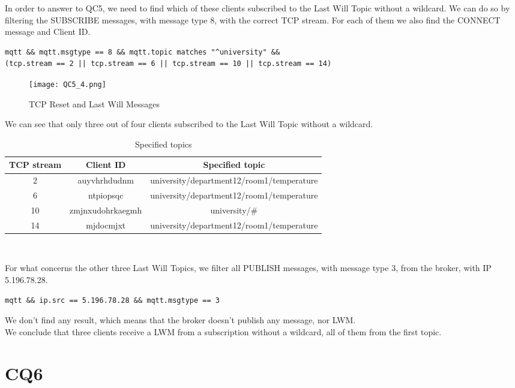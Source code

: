 In order to answer to QC5, we need to find which of these clients subscribed to the Last Will Topic without a wildcard. We can do so by filtering the SUBSCRIBE messages, with message type 8, with the correct TCP stream. For each of them we also find the CONNECT message and Client ID.
\begin{verbatim}
mqtt && mqtt.msgtype == 8 && mqtt.topic matches "^university" && 
(tcp.stream == 2 || tcp.stream == 6 || tcp.stream == 10 || tcp.stream == 14)
\end{verbatim}

\begin{figure}[H]
    \centering
    \texttt{[image: QC5\_4.png]}
    \caption{TCP Reset and Last Will Messages}
\end{figure}

We can see that only three out of four clients subscribed to the Last Will Topic without a wildcard.

\begin{table}[H]
\centering 
\begin{tabular}{| c | c | c |}
	\hline 
	\rowcolor{bluepoli!40}
	\textbf{TCP stream} & \textbf{Client ID} & \textbf{Specified topic}\T\B \\
	\hline 
	2 & auyvhrhdudnm & university/department12/room1/temperature \T\B\\
	6 & ntpiopsqc & university/department12/room1/temperature \T\B\\
	10 & zmjnxudohrkaegmh & university/\# \T\B\\
	14 & mjdocmjxt & university/department12/room1/temperature \T\B\\
	\hline
\end{tabular}
\\[10pt]
\caption{Specified topics}
\end{table}

For what concerns the other three Last Will Topics, we filter all PUBLISH messages, with message type 3, from the broker, with IP 5.196.78.28.
\begin{verbatim}
mqtt && ip.src == 5.196.78.28 && mqtt.msgtype == 3 
\end{verbatim}
We don't find any result, which means that the broker doesn't publish any message, nor LWM.\\
We conclude that three clients receive a LWM from a subscription without a wildcard, all of them from the first topic.

\section{CQ6}
